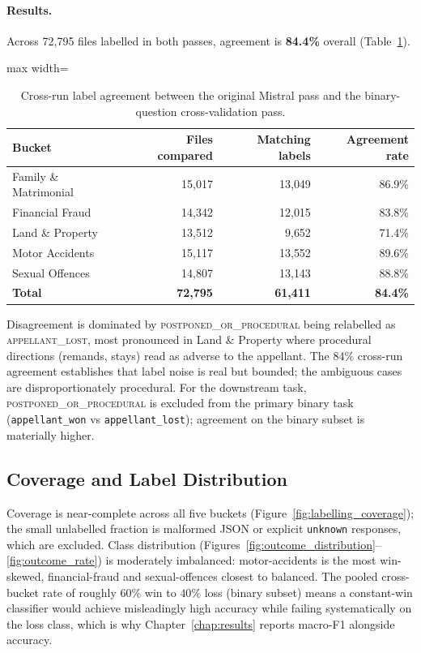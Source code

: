 \paragraph{Results.} Across 72{,}795 files labelled in both passes, agreement is \textbf{84.4\%} overall (Table~\ref{tab:crossval_agreement}).

\begin{table}[H]
  \centering
  \small
  \begin{adjustbox}{max width=\textwidth}
  \begin{tabular}{lrrr}
    \toprule
    Bucket & Files compared & Matching labels & Agreement rate \\
    \midrule
    Family \& Matrimonial & 15{,}017 & 13{,}049 & 86.9\% \\
    Financial Fraud       & 14{,}342 & 12{,}015 & 83.8\% \\
    Land \& Property      & 13{,}512 &  9{,}652 & 71.4\% \\
    Motor Accidents       & 15{,}117 & 13{,}552 & 89.6\% \\
    Sexual Offences       & 14{,}807 & 13{,}143 & 88.8\% \\
    \midrule
    \textbf{Total}        & \textbf{72{,}795} & \textbf{61{,}411} & \textbf{84.4\%} \\
    \bottomrule
  \end{tabular}
  \end{adjustbox}
  \caption{Cross-run label agreement between the original Mistral pass and the binary-question cross-validation pass.}
  \label{tab:crossval_agreement}
\end{table}

Disagreement is dominated by \textsc{postponed\_or\_procedural} being relabelled as \textsc{appellant\_lost}, most pronounced in Land \& Property where procedural directions (remands, stays) read as adverse to the appellant. The 84\% cross-run agreement establishes that label noise is real but bounded; the ambiguous cases are disproportionately procedural. For the downstream task, \textsc{postponed\_or\_procedural} is excluded from the primary binary task (\texttt{appellant\_won} vs \texttt{appellant\_lost}); agreement on the binary subset is materially higher.

\subsection{Coverage and Label Distribution}

Coverage is near-complete across all five buckets (Figure~\ref{fig:labelling_coverage}); the small unlabelled fraction is malformed JSON or explicit \texttt{unknown} responses, which are excluded. Class distribution (Figures~\ref{fig:outcome_distribution}--\ref{fig:outcome_rate}) is moderately imbalanced: motor-accidents is the most win-skewed, financial-fraud and sexual-offences closest to balanced. The pooled cross-bucket rate of roughly $60\%$ win to $40\%$ loss (binary subset) means a constant-win classifier would achieve misleadingly high accuracy while failing systematically on the loss class, which is why Chapter~\ref{chap:results} reports macro-F1 alongside accuracy.

